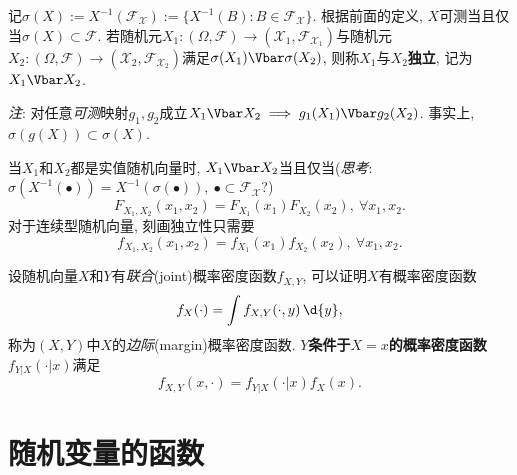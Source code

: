 记$\sigma(X) := X^{-1}(\mathscr{F}_{\mathcal{X}}) := \{X^{-1}(B):B\in\mathscr{F}_{\mathcal{X}}\}$. 根据前面的定义, $X$可测当且仅当$\sigma(X) \subset \mathscr{F}$. 若随机元$X_{1} : (\Omega,\mathscr{F}) \to (\mathcal{X}_{1},\mathscr{F}_{\mathcal{X}_{1}})$与随机元$X_{2} : (\Omega,\mathscr{F}) \to (\mathcal{X}_{2},\mathscr{F}_{\mathcal{X}_{2}})$满足$\sigma(X_{1})\indep\sigma(X_{2})$, 则称$X_{1}$与$X_{2}$\textbf{独立}, 记为$X_{1} \indep X_{2}$.

\emph{注}: 对任意\emph{可测}映射$g_{1},g_{2}$成立$X_{1} \indep X_{2} \implies g_{1}(X_{1}) \indep g_{2}(X_{2})$. 事实上, $\sigma(g(X)) \subset \sigma(X)$.

当$X_{1}$和$X_{2}$都是实值随机向量时, $X_{1} \indep X_{2}$当且仅当(\emph{思考}: $\sigma(X^{-1}(\bullet)) = X^{-1}(\sigma(\bullet)), \ \bullet\subset\mathscr{F}_{\mathcal{X}}$?)
\[ F_{X_{1},X_{2}}(x_{1},x_{2}) = F_{X_{1}}(x_{1})F_{X_{2}}(x_{2}), \ \forall x_{1},x_{2}. \]
对于连续型随机向量, 刻画独立性只需要
\[ f_{X_{1},X_{2}}(x_{1},x_{2}) = f_{X_{1}}(x_{1})f_{X_{2}}(x_{2}), \ \forall x_{1},x_{2}. \]

设随机向量$X$和$Y$有\emph{联合}(joint)概率密度函数$f_{X,Y}$, 可以证明$X$有概率密度函数
\[ f_{X}(\cdot) = \int f_{X,Y}(\cdot,y) \,\d{y}, \] 称为$(X,Y)$中$X$的\emph{边际}(margin)概率密度函数. \textbf{$Y$条件于$X=x$的概率密度函数}$f_{Y|X}(\cdot|x)$满足
\[ f_{X,Y}(x,\cdot) = f_{Y|X}(\cdot|x)f_{X}(x). \]

\section{随机变量的函数}

